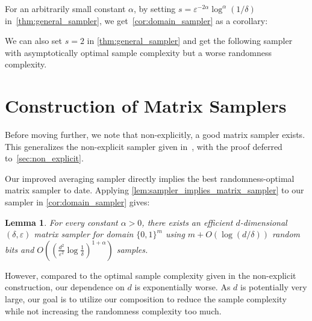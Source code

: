 \documentclass[10pt,a4paper]{article}
\newtheorem{corollary}[theorem]{Corollary}
\newtheorem{lemma}[theorem]{Lemma}
\newtheorem{remark}[theorem]{Remark}
\newcommand{\eps}{\varepsilon}
\newcommand{\1}{\mathbbm{1}}
\newcommand{\zo}{\{0, 1\}}
\begin{document}

For an arbitrarily small constant $\alpha$,  by setting $s = \eps^{-2\alpha}\log^{\alpha}(1 / \delta)$ in~\cref{thm:general_sampler}, we get~\cref{cor:domain_sampler} as a corollary:
\CorollaryTwo*



We can also set $s = 2$ in \cref{thm:general_sampler} and get the following sampler with asymptotically optimal sample complexity but a worse randomness complexity. 

\optimalSampleSampler*






\section{Construction of Matrix Samplers}
Before moving further, we note that non-explicitly, 
a good matrix sampler exists.
This generalizes the non-explicit sampler given in~\cite{CEG95}, with the proof deferred to~\cref{sec:non_explicit}.

\nonExplicit*

Our improved averaging sampler directly implies the best randomness-optimal matrix sampler to date.
Applying \cref{lem:sampler_implies_matrix_sampler} to our sampler in \cref{cor:domain_sampler} gives:
\begin{lemma} 
\label{lem:ours_based_matrix_sampler}
    For every constant $\alpha > 0$, there exists an efficient $d$-dimensional $(\delta, \eps)$ matrix sampler for domain $\zo^m$ using $m + O(\log (d / \delta))$ random bits and $O((\frac{d^2}{\eps^2}\log\frac{1}{\delta})^{1+\alpha})$ samples.
\end{lemma}
However, compared to the optimal sample complexity given in the non-explicit construction, our dependence on $d$ is exponentially worse.
As $d$ is potentially very large, our goal is to utilize our composition to reduce the sample complexity while not increasing the randomness complexity too much.
\end{document}
